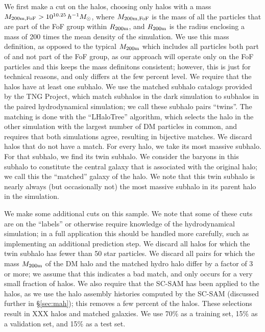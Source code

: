 We first make a cut on the \dark halos, choosing only halos with a mass $M_\mathrm{200m,FoF} > 10^{10.25} \, h^{-1} M_\mathrm{\odot}$, where $M_\mathrm{200m,FoF}$ is the mass of all the particles that are part of the FoF group within $R_\mathrm{200m}$, and $R_\mathrm{200m}$ is the radius enclosing a mass of 200 times the mean density of the simulation.
We use this mass definition, as opposed to the typical $M_\mathrm{200m}$ which includes all particles both part of and not part of the FoF group, as our approach will operate only on the FoF particles and this keeps the mass definitons consistent; however, this is just for technical reasons, and only differs at the few percent level.
We require that the halos have at least one subhalo.
We use the matched subhalo catalogs provided by the TNG Project, which match subhalos in the dark simulation to subhalos in the paired hydrodynamical simulation; we call these subhalo pairs ``twins''.
The matching is done with the ``LHaloTree'' algorithm, which selects the halo in the other simulation with the largest number of DM particles in common, and requires that both simulations agree, resulting in bijective matches.
We discard halos that do not have a \hydro match.
For every \dark halo, we take its most massive \dark subhalo.
For that \dark subhalo, we find its twin \hydro subhalo.
We consider the baryons in this subhalo to constitute the central galaxy that is associated with the original \dark halo; we call this the ``matched'' galaxy of the \dark halo. 
We note that this twin \hydro subhalo is nearly always (but occasionally not) the most massive subhalo in its parent halo in the \hydro simulation.

We make some additional cuts on this sample.
We note that some of these cuts are on the ``labels'' or otherwise require knowledge of the hydrodynamical simulation; in a full application this should be handled more carefully, such as implementing an additional prediction step. 
We discard all \dark halos for which the twin \hydro subhalo has fewer than 50 star particles.
We discard all pairs for which the mass $M_\mathrm{200m}$ of the DM halo and the matched hydro halo differ by a factor of 3 or more; we assume that this indicates a bad match, and only occurs for a very small fraction of halos.
We also require that the SC-SAM has been applied to the halos, as we use the halo assembly histories computed by the SC-SAM (discussed further in \S\ref{sec:mah}); this removes a few percent of the halos.
These selections result in XXX \dark halos and matched \hydro galaxies.
We use 70\% as a training set, 15\% as a validation set, and 15\% as a test set.



